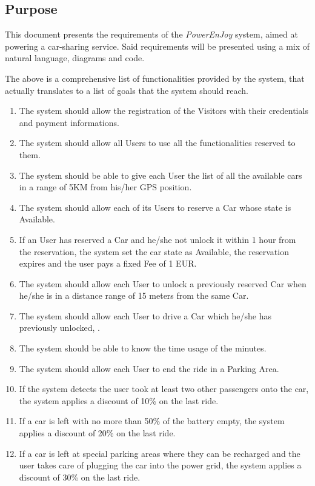 \subsection{Purpose}
This document presents the requirements of the \emph{PowerEnJoy} system, aimed at powering a car-sharing service. Said requirements will be presented using a mix of natural language, diagrams and code.

The above is a comprehensive list of functionalities provided by the system, that actually translates to a list of goals that the system should reach.

\begin{enumerate}
	\item The system should allow the registration of the Visitors with their credentials and payment informations.
	\item The system should allow all Users to use all the functionalities reserved to them.
	\item The system should be able to give each User the list of all the available cars in a range of 5KM from his/her GPS position.
	\item The system should allow each of its Users to reserve a Car whose state is Available.
	\item If an User has reserved a Car and he/she not unlock it within 1 hour from the reservation, the system set the car state as Available, the reservation expires and the user pays a fixed Fee of 1 EUR.  
	\item The system should allow each User to unlock a previously reserved Car when he/she is in a distance range of 15 meters from the same Car.
	\item The system should allow each User to drive a Car which he/she has previously unlocked, .
	\item The system should be able to know the time usage of the minutes.
	\item The system should allow each User to end the ride in a Parking Area.
	\item If the system detects the user took at least two other passengers onto the car, the system applies a discount of 10\% on the last ride. 
	\item If a car is left with no more than 50\% of the battery empty, the system applies a discount of 20\% on the last ride. 
	\item If a car is left at special parking areas where they can be recharged and the user takes care of plugging the car into the power grid, the system applies a discount of 30\% on the last ride. 

\end{enumerate}
